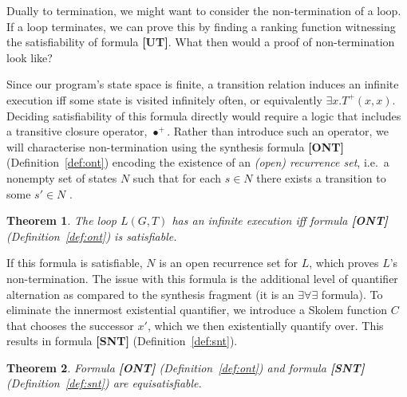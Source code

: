 \documentclass[preprint]{sigplanconf}
\newtheorem{theorem}{Theorem}
\theoremstyle{definition}
\begin{document}
Dually to termination, we might want to consider the non-termination of a loop.  If a loop terminates,
we can prove this by finding a ranking function %
witnessing the satisfiability of formula {\bf[UT]}.  What then would a proof of non-termination look like?

Since our program's state space is finite, a transition relation
induces an infinite execution iff some state is visited infinitely
often, or equivalently $ \exists x . T^+(x, x)$.
Deciding satisfiability of this formula directly would require a logic
that includes a transitive closure operator, $\bullet^+$.  Rather than
introduce such an operator, we will characterise non-termination
using the synthesis formula {\bf [ONT]} (Definition~\ref{def:ont})
encoding the existence of an \emph{(open) recurrence set}, i.e.~a nonempty 
set of states $N$ such that for each $s \in N$ there
exists a transition to some $s' \in N$ \cite{DBLP:conf/popl/GuptaHMRX08}.

\begin{theorem}
\label{thm:ont}
 The loop $L(G, T)$ has an infinite execution iff formula {\bf [ONT]} (Definition~\ref{def:ont}) is satisfiable.
\end{theorem}

%  

If this formula is satisfiable, $N$ is an open recurrence set for $L$, which proves
$L$'s non-termination. The issue with this formula is the additional level of quantifier alternation as compared to the synthesis fragment
(it is an $\exists \forall \exists$ formula).  To eliminate the innermost existential quantifier,
we introduce a Skolem function $C$ that chooses the successor $x'$, which we then existentially quantify over.  This results in
formula {\bf [SNT]} (Definition~\ref{def:snt}).

\begin{theorem}
 \label{thm:snt}
 Formula {\bf [ONT]} (Definition~\ref{def:ont}) and formula {\bf [SNT]} (Definition~\ref{def:snt}) are equisatisfiable.
\end{theorem}
\end{document}

